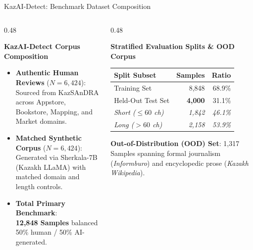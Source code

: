 \documentclass[aspectratio=169, 10pt]{beamer}
\newcommand{\subhead}[1]{{\normalsize\textbf{\color{DarkNavy}#1}\par\vspace{3pt}}}
\begin{document}
\begin{frame}{KazAI-Detect: Benchmark Dataset Composition}
    \begin{columns}[T]
        \begin{column}{0.48\textwidth}
            \subhead{KazAI-Detect Corpus Composition}
            \begin{itemize}\setlength{\itemsep}{6pt}
                \item \textbf{Authentic Human Reviews} ($N=6,424$): \\
                {\small Sourced from KazSAnDRA across Appstore, Bookstore, Mapping, and Market domains.}
                \item \textbf{Matched Synthetic Corpus} ($N=6,424$): \\
                {\small Generated via Sherkala-7B (Kazakh LLaMA) with matched domain and length controls.}
                \item \textbf{Total Primary Benchmark}: \\
                {\small\textbf{\color{DarkNavy}12,848 Samples} balanced 50\% human / 50\% AI-generated.}
            \end{itemize}
        \end{column}
        \begin{column}{0.48\textwidth}
            \subhead{Stratified Evaluation Splits \& OOD Corpus}
            \vspace{2pt}
            \begin{tabular*}{\linewidth}{@{\extracolsep{\fill}}lrr}
                \toprule
                \textbf{Split Subset} & \textbf{Samples} & \textbf{Ratio} \\
                \midrule
                Training Set & 8,848 & 68.9\% \\
                Held-Out Test Set & \textbf{4,000} & 31.1\% \\
                \quad \textit{Short ($\le 60$ ch)} & \textit{1,842} & \textit{46.1\%} \\
                \quad \textit{Long ($> 60$ ch)} & \textit{2,158} & \textit{53.9\%} \\
                \bottomrule
            \end{tabular*}
            \vspace{6pt}
            {\small\textbf{Out-of-Distribution (OOD) Set}: 1,317 Samples spanning formal journalism (\textit{Informburo}) and encyclopedic prose (\textit{Kazakh Wikipedia}).}
        \end{column}
    \end{columns}
\end{frame}
\end{document}
